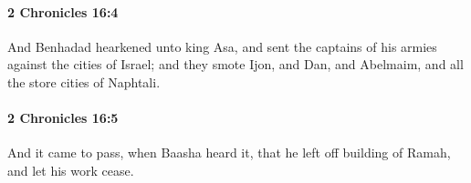 		\paragraph{2 Chronicles 16:4} %
			\label{2CHRONICLES-16-4}

			And Benhadad hearkened unto king Asa, and sent the captains of his armies against the cities of Israel; and they smote Ijon, and Dan, and Abelmaim, and all the store cities of Naphtali.


		\paragraph{2 Chronicles 16:5} %
			\label{2CHRONICLES-16-5}

			And it came to pass, when Baasha heard it, that he left off building of Ramah, and let his work cease.


